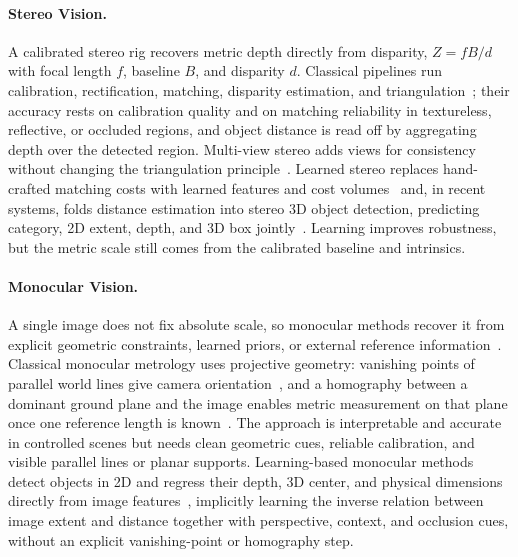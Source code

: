 \paragraph{Stereo Vision.}
A calibrated stereo rig recovers metric depth directly from disparity, $Z = fB/d$ with focal length $f$, baseline $B$, and disparity $d$.
Classical pipelines run calibration, rectification, matching, disparity estimation, and triangulation~\cite{zhang2000flexible,Scharstein2002Stereo,hartley2003multiple}; their accuracy rests on calibration quality and on matching reliability in textureless, reflective, or occluded regions, and object distance is read off by aggregating depth over the detected region. Multi-view stereo adds views for consistency without changing the triangulation principle~\cite{Seitz2006Middlebury,yao2018mvsnet}.
Learned stereo replaces hand-crafted matching costs with learned features and cost volumes~\cite{kendall2017end,chang2018pyramid,lipson2021raftstereo} and, in recent systems, folds distance estimation into stereo 3D object detection, predicting category, 2D extent, depth, and 3D box jointly~\cite{li2019stereorcnn,chen2020dsgn,guo2021ligastereo}. Learning improves robustness, but the metric scale still comes from the calibrated baseline and intrinsics.

\paragraph{Monocular Vision.}
A single image does not fix absolute scale, so monocular methods recover it from explicit geometric constraints, learned priors, or external reference information~\cite{hartley2003multiple,criminisi2000single}.
Classical monocular metrology uses projective geometry: vanishing points of parallel world lines give camera orientation~\cite{caprile1990using,hartley2003multiple}, and a homography between a dominant ground plane and the image enables metric measurement on that plane once one reference length is known~\cite{criminisi2000single,liebowitz1999metric}. The approach is interpretable and accurate in controlled scenes but needs clean geometric cues, reliable calibration, and visible parallel lines or planar supports.
Learning-based monocular methods detect objects in 2D and regress their depth, 3D center, and physical dimensions directly from image features~\cite{chen2016monocular,mousavian2017deep,manei2019monodis,brzozowski2019m3drpn,liu2020smoke,wang2021fcos3d,liu2022monocon,ma2021delving}, implicitly learning the inverse relation between image extent and distance together with perspective, context, and occlusion cues, without an explicit vanishing-point or homography step.

